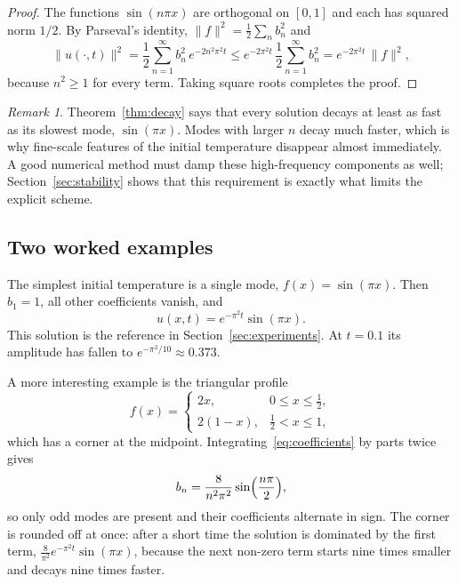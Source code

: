 \documentclass[11pt]{article}
\theoremstyle{definition}
\theoremstyle{remark}
\newtheorem{remark}[theorem]{Remark}
\begin{document}
\begin{proof}
The functions $\sin(n\pi x)$ are orthogonal on $[0,1]$ and each has squared norm $1/2$. By Parseval's identity, $\|f\|^2 = \tfrac{1}{2} \sum_n b_n^2$ and
\[
  \|u(\cdot,t)\|^2 = \frac{1}{2} \sum_{n=1}^{\infty} b_n^2 \, e^{-2 n^2 \pi^2 t}
  \le e^{-2 \pi^2 t} \, \frac{1}{2} \sum_{n=1}^{\infty} b_n^2
  = e^{-2 \pi^2 t} \, \|f\|^2 ,
\]
because $n^2 \ge 1$ for every term. Taking square roots completes the proof.
\end{proof}

\begin{remark}
Theorem~\ref{thm:decay} says that every solution decays at least as fast as its slowest mode, $\sin(\pi x)$. Modes with larger $n$ decay much faster, which is why fine-scale features of the initial temperature disappear almost immediately. A good numerical method must damp these high-frequency components as well; Section~\ref{sec:stability} shows that this requirement is exactly what limits the explicit scheme.
\end{remark}

\subsection{Two worked examples}

The simplest initial temperature is a single mode, $f(x) = \sin(\pi x)$. Then $b_1 = 1$, all other coefficients vanish, and
\begin{equation}\label{eq:exact-single}
  u(x,t) = e^{-\pi^2 t} \sin(\pi x).
\end{equation}
This solution is the reference in Section~\ref{sec:experiments}. At $t = 0.1$ its amplitude has fallen to $e^{-\pi^2/10} \approx 0.373$.

A more interesting example is the triangular profile
\begin{equation}
  f(x) =
  \begin{cases}
    2x, & 0 \le x \le \tfrac{1}{2}, \\[2pt]
    2(1 - x), & \tfrac{1}{2} < x \le 1,
  \end{cases}
\end{equation}
which has a corner at the midpoint. Integrating~\eqref{eq:coefficients} by parts twice gives
\begin{equation}
  b_n = \frac{8}{n^2 \pi^2} \sin\Bigl(\frac{n \pi}{2}\Bigr),
\end{equation}
so only odd modes are present and their coefficients alternate in sign. The corner is rounded off at once: after a short time the solution is dominated by the first term, $\tfrac{8}{\pi^2} e^{-\pi^2 t} \sin(\pi x)$, because the next non-zero term starts nine times smaller and decays nine times faster.
\end{document}
